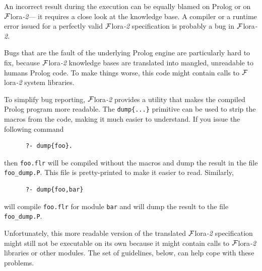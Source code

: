 \documentclass[11pt]{article}
\newcommand{\FLORA}{{\mbox{\sc ${\cal F}${lora}\rm\emph{-2}}}\xspace}
\newcommand{\FLSYSTEM}{\FLORA}
\newcommand{\flrext}{flr\xspace}
\begin{document}
An incorrect result during the execution can be equally blamed on Prolog or
on \FLSYSTEM --- it requires a close look at the knowledge base. A compiler or
a runtime error issued for a perfectly valid \FLSYSTEM specification
is probably a bug in \FLSYSTEM.

Bugs that are the fault of the underlying Prolog engine are particularly
hard to fix, because \FLSYSTEM knowledge bases are translated into mangled,
unreadable to humans Prolog code.  To make things worse, this code might
contain calls to \FLSYSTEM system libraries.

To simplify bug reporting, \FLSYSTEM provides a utility that makes the compiled
Prolog program more readable. The {\tt dump\{...\}}  primitive can be used to strip the
macros from the code, making it much easier to understand. If you issue the
following command
\begin{verbatim}
      ?- dump{foo}.  
\end{verbatim}
then {\tt foo.\flrext} will be compiled without the macros and dump the
result in the file {\tt foo\_dump.P}. This file is pretty-printed to make
it easier to read. Similarly,
\begin{verbatim}
      ?- dump{foo,bar}  
\end{verbatim}
will compile {\tt foo.\flrext} for module {\tt bar} and will dump the result to
the file {\tt foo\_dump.P}.

Unfortunately, this more readable version of the translated \FLSYSTEM
specification
might still not be executable on its own because it might contain calls to
\FLSYSTEM libraries or other modules.  The set of guidelines, below, can help
cope with these problems.
\end{document}
